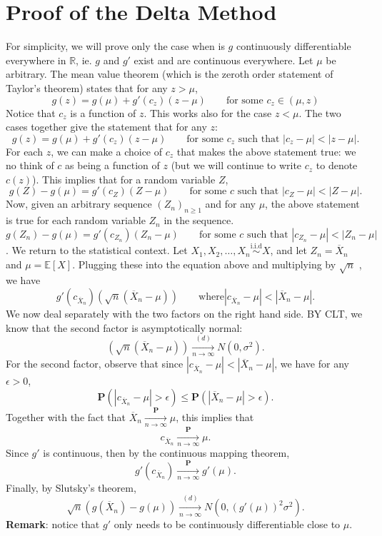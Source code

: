 \documentclass[10pt,landscape]{article}
\begin{document}
\section*{Proof of the Delta Method}

For simplicity, we will prove only the case when is $g$ continuously differentiable everywhere in $\mathbb{R}$, ie. $g$ and $g\prime$ exist and are continuous everywhere. Let $\mu$ be arbitrary. The mean value theorem (which is the zeroth order statement of Taylor's theorem) states that for any $z >\mu$,
$$  g(z)=g(\mu )+g'(c_ z)(z-\mu )\qquad \text {for some } c_ z\in (\mu ,z) $$
Notice that $c_z$ is a function of $z$. This works also for the case $z<\mu$. The two cases together give the statement that for any $z$:
$$g(z)=g(\mu )+g'(c_ z)(z-\mu )\qquad \text {for some } c_ z \text { such that } |c_ z-\mu |<|z-\mu |.$$
For each $z$, we can make a choice of $c_z$ that makes the above statement true: we no think of $c$ as being a function of $z$ (but we will continue to write $c_z$ to denote $c(z)$). This implies that for a random variable $Z$,
$$g(Z)-g(\mu )=g'(c_ Z)(Z-\mu )\qquad \text {for some } c \text { such that } |c_ Z-\mu |<|Z-\mu |.$$
Now, given an arbitrary sequence $(Z_n)_{n\ge1}$ and for any $\mu$, the above statement is true for each random variable $Z_n$ in the sequence.
$$g(Z_ n)-g(\mu )=g'(c_{Z_ n})(Z_ n-\mu )\qquad \text {for some } c \text { such that } |c_{Z_ n}-\mu | < |Z_ n - \mu |$$.
We return to the statistical context. Let $X_1, X_2,\ldots ,X_ n\stackrel{\text {i.i.d}}{\sim } X$, and let $Z_n=\overline X_n$ and $\mu=\mathbb{E}[X]$. Plugging these into the equation above and multiplying by $\sqrt{n}$ , we have
$$g'\left(c_{\overline{X}_ n}\right)\left(\sqrt{n}(\overline{X}_ n-\mu )\right) \qquad \text {where} \left|c_{\overline{X}_ n}-\mu \right|<\left|\overline{X}_ n-\mu \right|.$$
We now deal separately with the two factors on the right hand side. BY CLT, we know that the second factor is asymptotically normal:
$$\left(\sqrt{n}(\overline{X}_ n-\mu )\right)\xrightarrow [n \to \infty ]{(d)} N(0,\sigma ^2).$$
For the second factor, observe that since $\left|c_{\overline{X}_ n}-\mu \right|<\left|\overline{X}_ n-\mu \right|$, we have for any $\epsilon>0$,
$$\mathbf{P}\left(\left|c_{\overline{X}_ n}-\mu \right|>\epsilon \right)\leq \mathbf{P}\left(\left|\overline{X}_ n-\mu \right|>\epsilon \right).$$
Together with the fact that $\overline{X}_ n \xrightarrow [n\to \infty ]{\mathbf{P}} \mu$, this implies that
$$c_{\overline{X}_ n}\xrightarrow [n \to \infty ]{\mathbf{P}} \mu .$$
Since $g\prime$ is continuous, then by the continuous mapping theorem,
$$g'(c_{\overline{X}_ n})\xrightarrow [n \to \infty ]{\mathbf{P}} g'(\mu ).$$
Finally, by Slutsky's theorem,
$$\sqrt{n}\left(g(\overline{X}_ n)-g(\mu )\right)\xrightarrow [n \to \infty ]{(d)} N(0,\left(g'(\mu )\right)^2\sigma ^2).$$
\textbf{Remark}: notice that $g\prime$ only needs to be continuously differentiable close to $\mu$.
\end{document}
